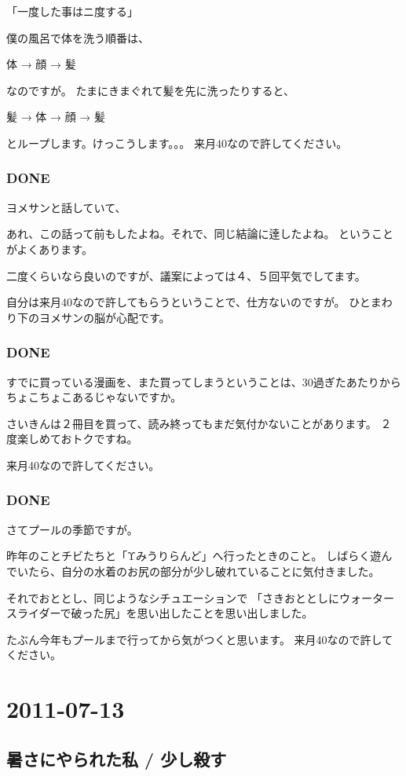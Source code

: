 \documentclass[11pt]{article}
\begin{document}
「一度した事はニ度する」

僕の風呂で体を洗う順番は、

 体 → 顔 → 髪

なのですが。
たまにきまぐれて髪を先に洗ったりすると、

 髪 → 体 → 顔 → 髪

とループします。けっこうします。。。 来月40なので許してください。
\subsubsection{\textbf{DONE}}
\label{sec-94_1_2}

ヨメサンと話していて、

あれ、この話って前もしたよね。それで、同じ結論に逹したよね。
ということがよくあります。

二度くらいなら良いのですが、議案によっては４、５回平気でしてます。

自分は来月40なので許してもらうということで、仕方ないのですが。
ひとまわり下のヨメサンの脳が心配です。
\subsubsection{\textbf{DONE}}
\label{sec-94_1_3}

すでに買っている漫画を、また買ってしまうということは、30過ぎたあたりから
ちょこちょこあるじゃないですか。

さいきんは２冊目を買って、読み終ってもまだ気付かないことがあります。
２度楽しめておトクですね。

来月40なので許してください。
\subsubsection{\textbf{DONE}}
\label{sec-94_1_4}

さてプールの季節ですが。

昨年のことチビたちと「Υみうりらんど」へ行ったときのこと。
しばらく遊んでいたら、自分の水着のお尻の部分が少し破れていることに気付きました。

それでおととし、同じようなシチュエーションで
「さきおととしにウォータースライダーで破った尻」を思い出したことを思い出しました。

たぶん今年もプールまで行ってから気がつくと思います。
来月40なので許してください。
\section{2011-07-13}
\label{sec-95}
\subsection{暑さにやられた私 / 少し殺す}
\label{sec-95_1}
\end{document}
